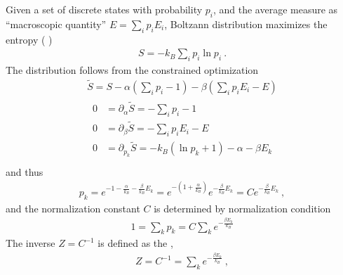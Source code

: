 \documentclass[letterpaper,10pt,english]{jupyterBook}
\begin{document}
\sphinxAtStartPar
Given a set of discrete states with probability \(p_i\), and the average measure as “macroscopic quantity” \(E = \sum_i p_i E_i\), Boltzann distribution maximizes the entropy ( )
\begin{equation*}
\begin{split}S = - k_B \sum_i p_i \ln p_i \ .\end{split}
\end{equation*}
\sphinxAtStartPar
The distribution follows from the constrained optimization
\begin{equation*}
\begin{split}\widetilde{S} = S - \alpha \left( \sum_i p_i -1  \right) - \beta \left( \sum_i p_i E_i - E \right)\end{split}
\end{equation*}\begin{equation*}
\begin{split}\begin{aligned}
  0 & = \partial_{\alpha} \widetilde{S} = - \sum_i p_i - 1 \\
  0 & = \partial_{\beta}  \widetilde{S} = - \sum_i p_i E_i - E \\
  0 & = \partial_{p_k}    \widetilde{S} = -k_B \left( \ln p_k + 1 \right) - \alpha - \beta E_k \\
\end{aligned}\end{split}
\end{equation*}
\sphinxAtStartPar
and thus
\begin{equation*}
\begin{split}p_k = e^{- 1 - \frac{\alpha}{k_B} - \frac{\beta}{k_B} E_k} = e^{-\left( 1 + \frac{\alpha}{k_B} \right)} e^{- \frac{\beta}{k_B} E_k} = C e^{-\frac{\beta}{k_B} E_k} \ ,\end{split}
\end{equation*}
\sphinxAtStartPar
and the normalization constant \(C\) is determined by normalization condition
\begin{equation*}
\begin{split}1 = \sum_k p_k = C \sum_{k} e^{-\frac{\beta E_k}{k_B}}\end{split}
\end{equation*}
\sphinxAtStartPar
The inverse \(Z = C^{-1}\) is defined as the ,
\begin{equation*}
\begin{split} Z = C^{-1} = \sum_k e^{-\frac{\beta E_k}{k_B}}\ ,\end{split}
\end{equation*}
\end{document}
